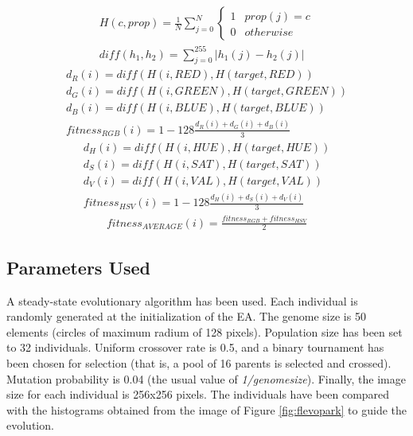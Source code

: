 \begin{eqnarray}
	\label{eq:histogram}
	H(c, prop) = \frac{1}{N}\sum_{j=0}^N \left\{\begin{matrix}
1 & prop(j) = c\\ 
0 & otherwise
\end{matrix}\right. \\
\label{eq:diff}
diff(h_1, h_2) = \sum_{j=0}^{255} |h_1(j) - h_2(j)|
\end{eqnarray}
\begin{eqnarray}
	d_R(i) = diff(H(i, RED), H(target, RED))\\
	d_G(i) = diff(H(i, GREEN), H(target, GREEN))\\
	d_B(i) =  diff(H(i, BLUE), H(target, BLUE))\\
	\label{eq:RGB}
	fitness_{RGB}(i) = 1 - 128\frac{d_R(i) + d_G(i) + d_B(i)}{3}
\end{eqnarray}
\begin{eqnarray}
	d_H(i) = diff(H(i, HUE), H(target, HUE))\\
	d_S(i) = diff(H(i, SAT), H(target, SAT))\\
	d_V(i) =  diff(H(i, VAL), H(target, VAL))\\
	\label{eq:HSV}
	fitness_{HSV}(i) = 1 - 128\frac{d_H(i) + d_S(i) + d_V(i)}{3}
\end{eqnarray}
\begin{eqnarray}
	\label{eq:AVERAGE}
	fitness_{AVERAGE}(i) = \frac{fitness_{RGB}+fitness_{HSV}}{2}
\end{eqnarray}


\subsection{Parameters Used}

A steady-state evolutionary algorithm has been used. %
Each individual is randomly generated at the initialization of the EA. The genome size is 50 elements (circles of maximum radium of 128 pixels). Population size has been set to 32 individuals. Uniform crossover rate is 0.5, and a binary tournament has been chosen for selection (that is, a pool of 16 parents is selected and crossed). Mutation probability is 0.04 (the usual value of {\em 1/genomesize}). Finally, the image size for each individual is 256x256 pixels. The individuals have been compared with the histograms obtained from the image of Figure \ref{fig:flevopark} to guide the evolution. 

